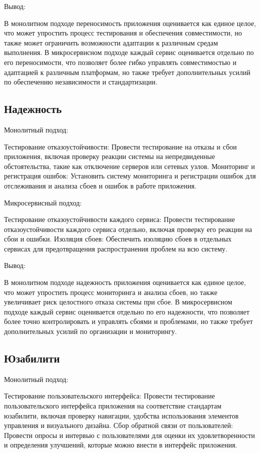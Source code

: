 Вывод:

    В монолитном подходе переносимость приложения оценивается как единое целое, что может упростить процесс тестирования и обеспечения совместимости, но также может ограничить возможности адаптации к различным средам выполнения.
    В микросервисном подходе каждый сервис оценивается отдельно по его переносимости, что позволяет более гибко управлять совместимостью и адаптацией к различным платформам, но также требует дополнительных усилий по обеспечению независимости и стандартизации.

\subsection{Надежность}

Монолитный подход:

    Тестирование отказоустойчивости: Провести тестирование на отказы и сбои приложения, включая проверку реакции системы на непредвиденные обстоятельства, такие как отключение серверов или сетевых узлов.
    Мониторинг и регистрация ошибок: Установить систему мониторинга и регистрации ошибок для отслеживания и анализа сбоев и ошибок в работе приложения.

Микросервисный подход:

    Тестирование отказоустойчивости каждого сервиса: Провести тестирование отказоустойчивости каждого сервиса отдельно, включая проверку его реакции на сбои и ошибки.
    Изоляция сбоев: Обеспечить изоляцию сбоев в отдельных сервисах для предотвращения распространения проблем на всю систему.

Вывод:

    В монолитном подходе надежность приложения оценивается как единое целое, что может упростить процесс мониторинга и анализа сбоев, но также увеличивает риск целостного отказа системы при сбое.
    В микросервисном подходе каждый сервис оценивается отдельно по его надежности, что позволяет более точно контролировать и управлять сбоями и проблемами, но также требует дополнительных усилий по организации и мониторингу.

\subsection{Юзабилити}

Монолитный подход:

    Тестирование пользовательского интерфейса: Провести тестирование пользовательского интерфейса приложения на соответствие стандартам юзабилити, включая проверку навигации, удобства использования элементов управления и визуального дизайна.
    Сбор обратной связи от пользователей: Провести опросы и интервью с пользователями для оценки их удовлетворенности и определения улучшений, которые можно внести в интерфейс приложения.

